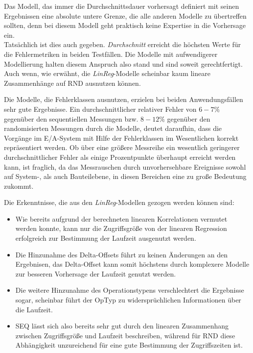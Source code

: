 \documentclass[
	12pt,
	a4paper,
	BCOR10mm,
	DIV14,
	listof=totoc,
	bibliography=totoc,
	headsepline
]{scrreprt}
\begin{document}
Das Modell, das immer die Durchschnittsdauer vorhersagt definiert mit seinen Ergebnissen eine absolute untere Grenze, die alle anderen Modelle zu übertreffen sollten, denn bei diesem Modell geht praktisch keine Expertise in die Vorhersage ein.\\ 
Tatsächlich ist dies auch gegeben. \textit{Durchschnitt} erreicht die höchsten Werte für die Fehlermetriken in beiden Testfällen.
Die Modelle mit aufwendigerer Modellierung halten diesem Anspruch also stand und sind soweit gerechtfertigt. Auch wenn, wie erwähnt, die \textit{LinReg}-Modelle scheinbar kaum lineare Zusammenhänge auf RND ausnutzen können.\medskip

Die Modelle, die Fehlerklassen ausnutzen, erzielen bei beiden Anwendungsfällen sehr gute Ergebnisse.
Ein durchschnittlicher relativer Fehler von $6-7\%$ gegenüber den sequentiellen Messungen bzw. $8-12\%$ gegenüber den randomisierten Messungen durch die Modelle, deutet daraufhin, dass die Vorgänge im E/A-System mit Hilfe der Fehlerklassen im Wesentlichen korrekt repräsentiert werden.
Ob über eine größere Messreihe ein wesentlich geringerer durchschnittlicher Fehler als einige Prozentpunkte überhaupt erreicht werden kann, ist fraglich, da das Messrauschen durch unvorhersehbare Ereignisse sowohl auf System-, als auch Bauteilebene, in diesen Bereichen eine zu große Bedeutung zukommt. \medskip
 
Die Erkenntnisse, die aus den \textit{LinReg}-Modellen gezogen werden können sind:
\begin{itemize}
	\item Wie bereits aufgrund der berechneten linearen Korrelationen vermutet werden konnte, kann nur die Zugriffsgröße von der linearen Regression erfolgreich zur Bestimmung der Laufzeit ausgenutzt werden.
	\item Die Hinzunahme des Delta-Offsets führt zu keinen Änderungen an den Ergebnisen, das Delta-Offset kann somit höchstens durch komplexere Modelle zur besseren Vorhersage der Laufzeit genutzt werden.
	\item Die weitere Hinzunahme des Operationstypens verschlechtert die Ergebnisse sogar, scheinbar führt der OpTyp zu widersprüchlichen Informationen über die Laufzeit.	
	\item SEQ lässt sich also bereits sehr gut durch den linearen Zusammenhang zwischen Zugriffsgröße und Laufzeit beschreiben, während für RND diese Abhängigkeit unzureichend für eine gute Bestimmung der Zugriffszeiten ist.
\end{itemize}
 
\end{document}
